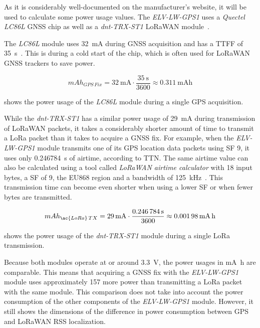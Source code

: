 As it is considerably well-documented on the manufacturer's website, it will be used to calculate some power usage values.
The \emph{ELV-LW-GPS1} uses a \emph{Quectel LC86L} \ac{GNSS} chip as well as a \emph{dnt-TRX-ST1} \ac{LoRaWAN} module~\cite{elv_elektronik_ag_elv_2023}.

The \emph{LC86L} module uses \SI{32}{\milli\ampere} during \ac{GNSS} acquisition and has a \ac{TTFF} of \SI{35}{\second}~\cite{quectel_gnss_nodate}.
This is during a cold start of the chip, which is often used for \ac{LoRaWAN} \ac{GNSS} trackers to save power.

\begin{equation}\label{eq:LC86L-fix-consumption}
    mAh_{GPS\,Fix} = \SI{32}{\milli\ampere} \cdot \frac{\SI{35}{\second}}{3600} \approx \SI{0.311}{\milli\ampere\hour}
\end{equation}

 shows the power usage of the \emph{LC86L} module during a single \ac{GPS} acquisition.

While the \emph{dnt-TRX-ST1} has a similar power usage of \SI{29}{\milli\ampere} during transmission of \ac{LoRaWAN} packets, it takes a considerably shorter amount of time to transmit a \ac{LoRa} packet than it takes to acquire a \ac{GNSS} fix.
For example, when the \emph{ELV-LW-GPS1} module transmits one of its \ac{GPS} location data packets using \ac{SF} 9, it uses only \SI{0.246784}{\second} of airtime, according to \ac{TTN}.
The same airtime value can also be calculated using a tool called \emph{\ac{LoRaWAN} airtime calculator} with 18 input bytes, a \ac{SF} of 9, the EU868 region and a bandwidth of \SI{125}{\kilo\hertz}~\cite{the_things_network_lorawan_nodate}.
This transmission time can become even shorter when using a lower \ac{SF} or when fewer bytes are transmitted.

\begin{equation}\label{eq:dnt-TRX-ST1-tx-consumption}
    mAh_{\ac{LoRa}\,TX} = \SI{29}{\milli\ampere} \cdot \frac{\SI{0.246784}{\second}}{3600} \approx \SI{0.00198}{\milli\ampere\hour}
\end{equation}

 shows the power usage of the \emph{dnt-TRX-ST1} module during a single \ac{LoRa} transmission.

Because both modules operate at or around \SI{3.3}{\volt}, the power usages in \si{\milli\ampere\hour} are comparable.
This means that acquiring a \ac{GNSS} fix with the \emph{ELV-LW-GPS1} module uses approximately \SI{157}{\times} more power than transmitting a \ac{LoRa} packet with the same module.
This comparison does not take into account the power consumption of the other components of the \emph{ELV-LW-GPS1} module.
However, it still shows the dimensions of the difference in power consumption between \ac{GPS} and \ac{LoRaWAN} \ac{RSS} localization.

